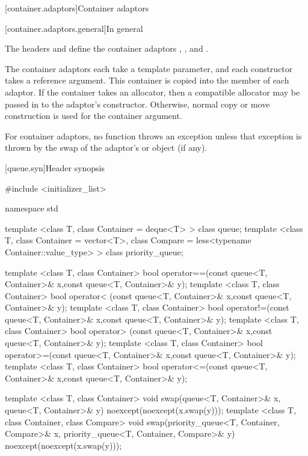 \begin{itemdescr}
\pnum\effects {}
\end{itemdescr}


[container.adaptors]{Container adaptors}

[container.adaptors.general]{In general}

\pnum
The headers  and  define the container adaptors
, , and .

\pnum
The container adaptors each take a  template parameter, and each constructor takes
a  reference argument. This container is copied into the  member
of each adaptor. If the container takes an allocator, then a compatible allocator may be passed in
to the adaptor's constructor. Otherwise, normal copy or move construction is used for the container
argument.

\pnum
For container adaptors, no  function throws an exception unless that
exception is thrown by the swap of the adaptor's  or
 object (if any).

[queue.syn]{Header  synopsis}%

\begin{codeblock}
#include <initializer_list>

namespace std {

  template <class T, class Container = deque<T> > class queue;
  template <class T, class Container = vector<T>,
    class Compare = less<typename Container::value_type> >
      class priority_queue;

  template <class T, class Container>
    bool operator==(const queue<T, Container>& x,const queue<T, Container>& y);
  template <class T, class Container>
    bool operator< (const queue<T, Container>& x,const queue<T, Container>& y);
  template <class T, class Container>
    bool operator!=(const queue<T, Container>& x,const queue<T, Container>& y);
  template <class T, class Container>
    bool operator> (const queue<T, Container>& x,const queue<T, Container>& y);
  template <class T, class Container>
    bool operator>=(const queue<T, Container>& x,const queue<T, Container>& y);
  template <class T, class Container>
    bool operator<=(const queue<T, Container>& x,const queue<T, Container>& y);

  template <class T, class Container>
    void swap(queue<T, Container>& x, queue<T, Container>& y) noexcept(noexcept(x.swap(y)));
  template <class T, class Container, class Compare>
    void swap(priority_queue<T, Container, Compare>& x,
              priority_queue<T, Container, Compare>& y) noexcept(noexcept(x.swap(y)));
}
\end{codeblock}


